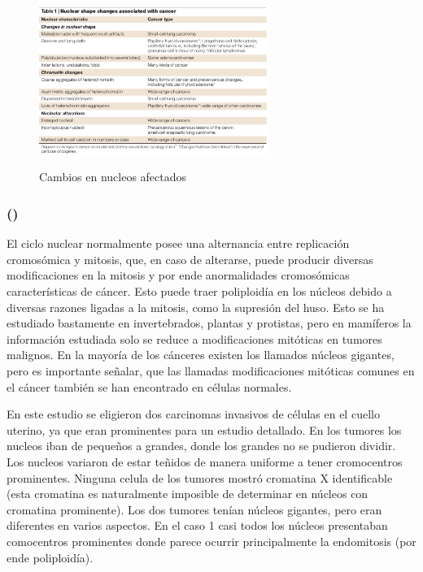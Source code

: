 \documentclass[12pt, letterpaper]{article}
\begin{document}
\begin{figure}[h]
\centering
	\includegraphics[width=7.5cm]{table-1-zinkNuclearStructureCancer2004.png}
	\label{fig: zink-table-1}
	\caption{Cambios en nucleos afectados}
	\autocite{zinkNuclearStructureCancer2004}
\end{figure}
\newpage

\subsubsection{\texorpdfstring{ (\citeauthor{thermanStructureOriginGiant1983})}{}}

El ciclo nuclear normalmente posee una alternancia entre replicación cromosómica y mitosis, que, en caso de alterarse, puede producir diversas modificaciones en la mitosis y por ende anormalidades cromosómicas características de cáncer. Esto puede traer poliploidía en los núcleos debido a diversas razones ligadas a la mitosis, como la supresión del huso. Esto se ha estudiado bastamente en invertebrados, plantas y protistas, pero en mamíferos la información estudiada solo se reduce a modificaciones mitóticas en tumores malignos. En la mayoría de los cánceres existen los llamados núcleos gigantes, pero es importante señalar, que las llamadas modificaciones mitóticas comunes en el cáncer también se han encontrado en células normales.


En este estudio se eligieron dos carcinomas invasivos de células en el cuello uterino, ya que eran prominentes para un estudio detallado. En los tumores los nucleos iban de pequeños a grandes, donde los grandes no se pudieron dividir. Los nucleos variaron de estar teñidos de manera uniforme a tener cromocentros prominentes. Ninguna celula de los tumores mostró cromatina X identificable (esta cromatina es naturalmente imposible de determinar en núcleos con cromatina prominente). Los dos tumores tenían núcleos gigantes, pero eran diferentes en varios aspectos. En el caso 1 casi todos los núcleos presentaban comocentros prominentes donde parece ocurrir principalmente la endomitosis (por ende poliploidía).
\end{document}
